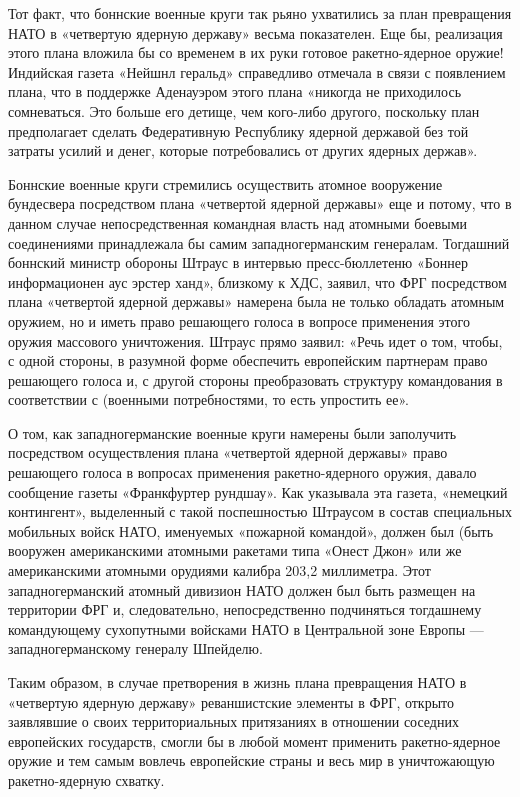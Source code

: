 \documentclass[12pt, a4paper, openany]{book}
\begin{document}
Тот факт, что боннские военные круги так рьяно ухватились за план превращения НАТО в «четвертую ядерную державу» весьма показателен. Еще бы, реализация этого плана вложила бы со временем в их руки готовое ракетно-ядерное оружие! Индийская газета «Нейшнл геральд» справедливо отмечала в связи с появлением плана, что в поддержке Аденауэром этого плана «никогда не приходилось сомневаться. Это больше его детище, чем кого-либо другого, поскольку план предполагает сделать Федеративную Республику ядерной державой без той затраты усилий и денег, которые потребовались от других ядерных держав».
	
Боннские военные круги стремились осуществить атомное вооружение бундесвера посредством плана «четвертой ядерной державы» еще и потому, что в данном случае непосредственная командная власть над атомными боевыми соединениями принадлежала бы самим западногерманским генералам. Тогдашний боннский министр обороны Штраус в интервью пресс-бюллетеню «Боннер информационен аус эрстер ханд», близкому к ХДС, заявил, что ФРГ посредством плана «четвертой ядерной державы» намерена была не только обладать атомным оружием, но и иметь право решающего голоса в вопросе применения этого оружия массового уничтожения. Штраус прямо заявил: «Речь идет о том, чтобы, с одной стороны, в разумной форме обеспечить европейским партнерам право решающего голоса и, с другой стороны преобразовать структуру командования в соответствии с (военными потребностями, то есть упростить ее».
	
О том, как западногерманские военные круги намерены были заполучить посредством осуществления плана «четвертой ядерной державы» право решающего голоса в вопросах применения ракетно-ядерного оружия, давало сообщение газеты «Франкфуртер рундшау». Как указывала эта газета, «немецкий контингент», выделенный с такой поспешностью Штраусом в состав специальных мобильных войск НАТО, именуемых «пожарной командой», должен был (быть вооружен американскими атомными ракетами типа «Онест Джон» или же американскими атомными орудиями калибра 203,2 миллиметра. Этот западногерманский атомный дивизион НАТО должен был быть размещен на территории ФРГ и, следовательно, непосредственно подчиняться тогдашнему командующему сухопутными войсками НАТО в Центральной зоне Европы — западногерманскому генералу Шпейделю.
	
Таким образом, в случае претворения в жизнь плана превращения НАТО в «четвертую ядерную державу» реваншистские элементы в ФРГ, открыто заявлявшие о своих территориальных притязаниях в отношении соседних европейских государств, смогли бы в любой момент применить ракетно-ядерное оружие и тем самым вовлечь европейские страны и весь мир в уничтожающую ракетно-ядерную схватку.
	
\end{document}
